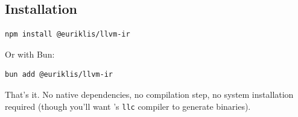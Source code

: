 \subsection{Installation}

\begin{lstlisting}[style=ts]
npm install @euriklis/llvm-ir
\end{lstlisting}

Or with Bun:
\begin{lstlisting}[style=ts]
bun add @euriklis/llvm-ir
\end{lstlisting}

That's it. No native dependencies, no compilation step, no system  installation required (though you'll want 's \texttt{llc} compiler to generate binaries).

